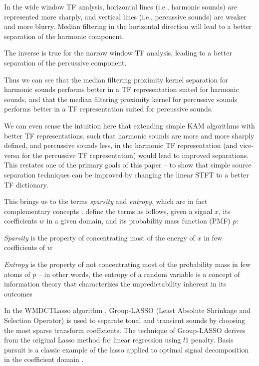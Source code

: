 \documentclass[letter,12pt]{article}
\newenvironment{tight_itemize}{
\begin{itemize}
  \setlength{\itemsep}{0pt}
  \setlength{\parskip}{0pt}
}{\end{itemize}}
\begin{document}
\begin{tight_itemize}
	\item
		In the wide window TF analysis, horizontal lines (i.e., harmonic sounds) are represented more sharply, and vertical lines (i.e., percussive sounds) are weaker and more blurry. Median filtering in the horizontal direction will lead to a better separation of the harmonic component.
	\item
		The inverse is true for the narrow window TF analysis, leading to a better separation of the percussive component.
\end{tight_itemize}

Thus we can see that the median filtering proximity kernel separation for harmonic sounds performs better in a TF representation suited for harmonic sounds, and that the median filtering proximity kernel for percussive sounds performs better in a TF representation suited for percussive sounds.

We can even sense the intuition here that extending simple KAM algorithms with better TF representations, such that harmonic sounds are more and more sharply defined, and percussive sounds less, in the harmonic TF representation (and vice-versa for the percussive TF representation) would lead to improved separations. This restates one of the primary goals of this paper -- to show that simple source separation techniques can be improved by changing the linear STFT to a better TF dictionary.

This brings us to the terms \textit{sparsity} and \textit{entropy}, which are in fact complementary concepts \cite{honeine2014entropy}. \citet{pastor2015mathematics} define the terms as follows, given a signal $x$, its coefficients $w$ in a given domain, and its probability mass function (PMF) $p$:
\begin{tight_itemize}
	\item
		\textit{Sparsity} is the property of concentrating most of the energy of $x$ in few coefficients of $w$
	\item
		\textit{Entropy} is the property of not concentrating most of the probability mass in few atoms of $p$ -- in other words, the entropy of a random variable is a concept of information theory that characterizes the unpredictability inherent in its outcomes
\end{tight_itemize}

In the WMDCTLasso algorithm \cite{wmdct}, Group-LASSO (Least Absolute Shrinkage and Selection Operator) is used to separate tonal and transient sounds by choosing the most sparse transform coefficients. The technique of Group-LASSO derives from the original Lasso \cite{tibshirani} method for linear regression using $l1$ penalty. Basis pursuit is a classic example of the lasso applied to optimal signal decomposition in the coefficient domain \cite{dictionary1}.
\end{document}
